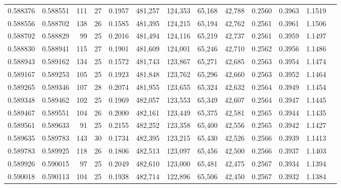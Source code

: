 \begin{tabular}{rrrrrrrrrrrrr}
0.588376 & 0.588551 & 111 &  27 &                                     0.1957 & 481,257 & 124,353 &  65,168 &  42,788 & 0.2560 & 0.3963 & 1.1519 \\
0.588556 & 0.588702 & 138 &  26 &                                     0.1585 & 481,395 & 124,215 &  65,194 &  42,762 & 0.2561 & 0.3961 & 1.1506 \\
0.588702 & 0.588829 &  99 &  25 &                                     0.2016 & 481,494 & 124,116 &  65,219 &  42,737 & 0.2561 & 0.3959 & 1.1497 \\
0.588830 & 0.588941 & 115 &  27 &                                     0.1901 & 481,609 & 124,001 &  65,246 &  42,710 & 0.2562 & 0.3956 & 1.1486 \\
0.588943 & 0.589162 & 134 &  25 &                                     0.1572 & 481,743 & 123,867 &  65,271 &  42,685 & 0.2563 & 0.3954 & 1.1474 \\
0.589167 & 0.589253 & 105 &  25 &                                     0.1923 & 481,848 & 123,762 &  65,296 &  42,660 & 0.2563 & 0.3952 & 1.1464 \\
0.589265 & 0.589346 & 107 &  28 &                                     0.2074 & 481,955 & 123,655 &  65,324 &  42,632 & 0.2564 & 0.3949 & 1.1454 \\
0.589348 & 0.589462 & 102 &  25 &                                     0.1969 & 482,057 & 123,553 &  65,349 &  42,607 & 0.2564 & 0.3947 & 1.1445 \\
0.589467 & 0.589551 & 104 &  26 &                                     0.2000 & 482,161 & 123,449 &  65,375 &  42,581 & 0.2565 & 0.3944 & 1.1435 \\
0.589561 & 0.589633 &  91 &  25 &                                     0.2155 & 482,252 & 123,358 &  65,400 &  42,556 & 0.2565 & 0.3942 & 1.1427 \\
0.589635 & 0.589783 & 143 &  30 &                                     0.1734 & 482,395 & 123,215 &  65,430 &  42,526 & 0.2566 & 0.3939 & 1.1413 \\
0.589783 & 0.589925 & 118 &  26 &                                     0.1806 & 482,513 & 123,097 &  65,456 &  42,500 & 0.2566 & 0.3937 & 1.1403 \\
0.589926 & 0.590015 &  97 &  25 &                                     0.2049 & 482,610 & 123,000 &  65,481 &  42,475 & 0.2567 & 0.3934 & 1.1394 \\
0.590018 & 0.590113 & 104 &  25 &                                     0.1938 & 482,714 & 122,896 &  65,506 &  42,450 & 0.2567 & 0.3932 & 1.1384 \\

\end{tabular}
